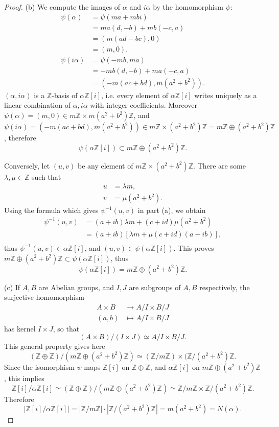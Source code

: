 \documentclass[11pt,a4paper]{article}
\newcommand{\Z}{\mathbb{Z}}
\begin{document}
\begin{proof}
\item[(b)] We compute the images of $\alpha$ and $i\alpha$ by the homomorphism $\psi$:
\begin{align*}
\psi(\alpha) &=\psi(ma + mbi)\\
&=ma(d,-b) + mb(-c,a)\\
&= (m(ad-bc), 0)\\
&=(m,0),\\
\psi(i\alpha) &= \psi(-mb, ma)\\
&=-mb(d,-b)+ ma(-c,a)\\
&=(-m(ac+bd), m(a^2+b^2)).
\end{align*}
$(\alpha, i\alpha)$ is a $\Z$-basis of $\alpha \Z[i]$, i.e. every element of $\alpha\Z[i]$ writes uniquely as a linear combination of $\alpha, i \alpha$ with integer coefficients. Moreover $\psi(\alpha) = (m,0) \in m\Z \times m(a^2+b^2)\Z$, and $\psi(i\alpha) = (-m(ac+bd), m(a^2+b^2)) \in m\Z \times (a^2+b^2)\Z = m\Z \oplus (a^2+b^2)\Z$, therefore 
$$\psi(\alpha\Z[i]) \subset m\Z \oplus (a^2+b^2)\Z.$$

Conversely, let $(u,v)$ be any element of $m\Z \times (a^2+b^2)\Z$. There are some $\lambda, \mu \in \Z$ such that
\begin{align*}
u &= \lambda m,\\
v &= \mu(a^2+b^2).
\end{align*}
Using the formula which gives $\psi^{-1}(u,v)$ in part (a), we obtain
\begin{align*}
\psi^{-1}(u,v) &=(a+ib) \lambda m + (c+id)\mu(a^2+b^2)\\
&=(a+ib) \left[ \lambda m + \mu(c+id)(a-ib)\right],\\
\end{align*}
thus $\psi^{-1}(u,v) \in \alpha \Z[i]$, and $(u,v) \in \psi(\alpha \Z[i])$. This proves $m\Z \oplus (a^2+b^2)\Z  \subset \psi(\alpha\Z[i])$, thus
$$\psi(\alpha\Z[i]) = m\Z \oplus (a^2+b^2)\Z .$$

\item[(c)]
If $A,B$ are Abelian groups, and $I,J$ are subgroups of $A,B$ respectively, the surjective homomorphism
$$
\begin{array}{ccc}
A \times B & \to A/I \times B/J\\
(a,b) & \mapsto A/I \times B/J
\end{array}
$$
has kernel $I \times J$, so that 
$$(A\times B) / (I \times J) \simeq A/I \times B/J.$$
This general property gives here
$$(\Z \oplus\Z)/(m\Z \oplus (a^2+b^2)\Z) \simeq (\Z/m\Z) \times (\Z/(a^2+b^2)\Z.$$
Since the isomorphism $\psi$ maps $\Z[i]$ on $\Z \oplus\Z$, and $\alpha \Z[i]$ on $m\Z \oplus (a^2+b^2)\Z$, this implies
$$\Z[i]/\alpha \Z[i] \simeq (\Z \oplus\Z)/(m\Z \oplus (a^2+b^2)\Z) \simeq \Z/m\Z \times \Z/(a^2+b^2)\Z.$$
Therefore
$$|\Z[i]/\alpha \Z[i] | = |\Z/m\Z|  \cdot |\Z/(a^2+b^2)\Z| = m(a^2+b^2) = N(\alpha).$$
\end{proof}
\end{document}
